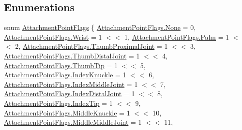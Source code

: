 \subsection*{Enumerations}
\begin{DoxyCompactItemize}
\item 
enum \mbox{\hyperlink{namespace_leap_1_1_unity_1_1_attachments_a4b32b38f722ad110fcd5a817256e09ab}{Attachment\+Point\+Flags}} \{ \newline
\mbox{\hyperlink{namespace_leap_1_1_unity_1_1_attachments_a4b32b38f722ad110fcd5a817256e09aba6adf97f83acf6453d4a6a4b1070f3754}{Attachment\+Point\+Flags.\+None}} = 0, 
\mbox{\hyperlink{namespace_leap_1_1_unity_1_1_attachments_a4b32b38f722ad110fcd5a817256e09aba4596b383ef8a39fa1d316b94cd9eb3fb}{Attachment\+Point\+Flags.\+Wrist}} = 1 $<$$<$ 1, 
\mbox{\hyperlink{namespace_leap_1_1_unity_1_1_attachments_a4b32b38f722ad110fcd5a817256e09aba5ff7107fd0d193e37b4d64f2bfc11be7}{Attachment\+Point\+Flags.\+Palm}} = 1 $<$$<$ 2, 
\mbox{\hyperlink{namespace_leap_1_1_unity_1_1_attachments_a4b32b38f722ad110fcd5a817256e09aba84876e5f637c5c2a43a9870d15d93a53}{Attachment\+Point\+Flags.\+Thumb\+Proximal\+Joint}} = 1 $<$$<$ 3, 
\newline
\mbox{\hyperlink{namespace_leap_1_1_unity_1_1_attachments_a4b32b38f722ad110fcd5a817256e09aba6f061c8c0921b7e4c4f2b70f02e48773}{Attachment\+Point\+Flags.\+Thumb\+Distal\+Joint}} = 1 $<$$<$ 4, 
\mbox{\hyperlink{namespace_leap_1_1_unity_1_1_attachments_a4b32b38f722ad110fcd5a817256e09aba67e0894399a5710e44ccdc7718b7ac60}{Attachment\+Point\+Flags.\+Thumb\+Tip}} = 1 $<$$<$ 5, 
\mbox{\hyperlink{namespace_leap_1_1_unity_1_1_attachments_a4b32b38f722ad110fcd5a817256e09aba0ab8d0ed6db2674e36ff1527c46795a5}{Attachment\+Point\+Flags.\+Index\+Knuckle}} = 1 $<$$<$ 6, 
\mbox{\hyperlink{namespace_leap_1_1_unity_1_1_attachments_a4b32b38f722ad110fcd5a817256e09abae5f5c6d0e978759ff5c30deec5ae03ad}{Attachment\+Point\+Flags.\+Index\+Middle\+Joint}} = 1 $<$$<$ 7, 
\newline
\mbox{\hyperlink{namespace_leap_1_1_unity_1_1_attachments_a4b32b38f722ad110fcd5a817256e09abaec7cddf0c3d7c4ae2b529874b5b9c392}{Attachment\+Point\+Flags.\+Index\+Distal\+Joint}} = 1 $<$$<$ 8, 
\mbox{\hyperlink{namespace_leap_1_1_unity_1_1_attachments_a4b32b38f722ad110fcd5a817256e09abaa5dc7686b6d8c7ed945036e7b4d8d8ad}{Attachment\+Point\+Flags.\+Index\+Tip}} = 1 $<$$<$ 9, 
\mbox{\hyperlink{namespace_leap_1_1_unity_1_1_attachments_a4b32b38f722ad110fcd5a817256e09aba9ef0d44e210a6133894c3ebfa90a9d2c}{Attachment\+Point\+Flags.\+Middle\+Knuckle}} = 1 $<$$<$ 10, 
\mbox{\hyperlink{namespace_leap_1_1_unity_1_1_attachments_a4b32b38f722ad110fcd5a817256e09abaf9d8ecd871e2629eb57dcab59793b28c}{Attachment\+Point\+Flags.\+Middle\+Middle\+Joint}} = 1 $<$$<$ 11, 
$$
\end{DoxyCompactItemize}
